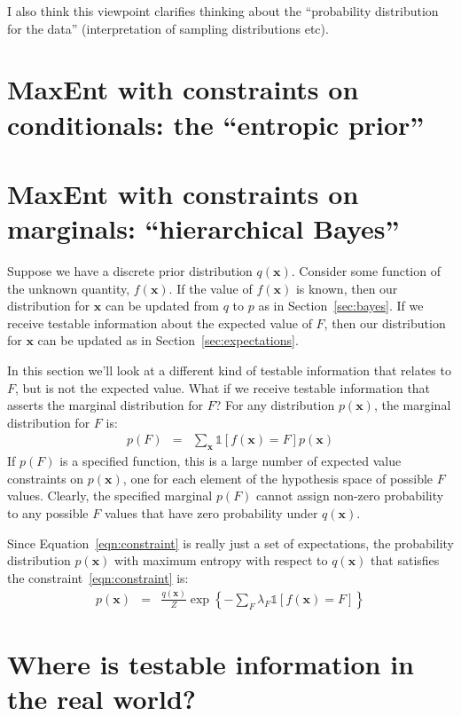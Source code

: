 \documentclass[a4paper, 11pt]{article}
\newcommand{\xx}{\boldsymbol{x}}
\begin{document}
I also think this viewpoint clarifies thinking about the ``probability
distribution for the data'' (interpretation of sampling distributions etc).

\section{MaxEnt with constraints on conditionals: the ``entropic prior''}


\section{MaxEnt with constraints on marginals: ``hierarchical Bayes''}
Suppose we have a discrete prior distribution $q(\xx)$. Consider some
function of the unknown quantity, $f(\xx)$.
If the value of $f(\xx)$ is known, then our distribution for $\xx$ can
be updated from $q$ to $p$ as in Section~\ref{sec:bayes}.
If we receive testable information
about the expected value of $F$, then our distribution for $\xx$ can
be updated as in Section~\ref{sec:expectations}.

In this section we'll look at a different kind of testable information that
relates to $F$, but is not the expected value. What if we receive testable
information that asserts the marginal distribution for $F$?
For any distribution $p(\xx)$, the marginal distribution for $F$ is:
\begin{eqnarray}
p(F) &=& \sum_{\xx}\mathds{1}\left[f(\xx) = F\right]p(\xx)\label{eqn:constraint}
\end{eqnarray}
If $p(F)$ is a specified function, this is a large number of expected
value constraints on $p(\xx)$, one for each element of the hypothesis space
of possible $F$ values. Clearly, the specified marginal $p(F)$ cannot assign
non-zero probability to any possible $F$ values that have zero probability
under $q(\xx)$.

Since Equation~\ref{eqn:constraint} is really just a set of expectations,
the probability distribution
$p(\xx)$ with maximum entropy with respect to $q(\xx)$ that satisfies the
constraint~\ref{eqn:constraint} is:
\begin{eqnarray}
p(\xx) &=& \frac{q(\xx)}{Z}\exp\left\{-\sum_F \lambda_F \mathds{1}
\left[f(\xx) = F\right]  \right\}
\end{eqnarray}


\section{Where is testable information in the real world?}
\end{document}
